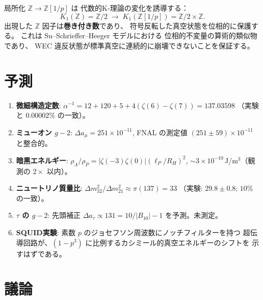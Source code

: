\documentclass[11pt,a4paper]{article}
\begin{document}
局所化 $\mathbb{Z}\to\mathbb{Z}[1/p]$ は
代数的K-理論の変化を誘導する：
\begin{equation}
  K_1(\mathbb{Z})=\mathbb{Z}/2 \;\longrightarrow\;
  K_1(\mathbb{Z}[1/p])=\mathbb{Z}/2\times\mathbb{Z}.
\end{equation}
出現した $\mathbb{Z}$ 因子は\textbf{巻き付き数}であり、
符号反転した真空状態を位相的に保護する。
これは Su--Schrieffer--Heeger モデルにおける
位相的不変量の算術的類似物であり、
WEC 違反状態が標準真空に連続的に崩壊できないことを保証する。

\section{予測}

\begin{enumerate}
\item \textbf{微細構造定数}:
$\alpha^{-1}=12+120+5+4(\zeta(6)-\zeta(7))=137.03598$
（実験と $0.00002\%$ の一致）。

\item \textbf{ミューオン $g-2$}: $\Delta a_\mu=251\times 10^{-11}$,
FNAL の測定値 $(251\pm 59)\times 10^{-11}$ と整合的。

\item \textbf{暗黒エネルギー}: $\rho_\Lambda/\rho_P=|\zeta(-3)\zeta(0)|
(\ell_P/R_H)^2$,
$\sim 3\times 10^{-10}$\,J/m$^3$（観測の $2\times$ 以内）。

\item \textbf{ニュートリノ質量比}:
$\Delta m^2_{32}/\Delta m^2_{21}\approx\pi(137)=33$
（実験: $29.8\pm 0.8$; $10\%$ の一致）。

\item \textbf{$\tau$ の $g-2$}: 先頭補正
$\Delta a_\tau\propto 131=10/|B_{10}|-1$ を予測。未測定。

\item \textbf{SQUID実験}: 素数 $p$ のジョセフソン周波数にノッチフィルターを持つ
超伝導回路が、$(1-p^3)$ に比例するカシミール的真空エネルギーのシフトを
示すはずである。
\end{enumerate}

\section{議論}
\end{document}
